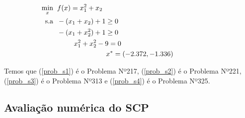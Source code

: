 
\vspace{-0.5cm}

\begin{subequations}
  \label{prob_s4}
  \begin{align}
    \hspace{0pt}\hfill \underset{x}{\text{min}} \hspace{0.2cm} & f(x) =  x_1^2 + x_2 \hspace{2.18cm} \\
    \hspace{0pt}\hfill \text{s.a} \hspace{0.2cm} & -(x_1 + x_2) + 1 \geq 0 \hspace{2.18cm} \\
    \hspace{0pt}\hfill & \hspace{0cm} -(x_1 + x_2^2) + 1 \geq 0 \hspace{2.18cm} \\
    \hspace{0pt}\hfill & \hspace{0.85cm} x_1^2 + x_2^2 - 9 = 0 \hspace{2.18cm} \\
    \hspace{0pt}\hfill & \hspace{2.48cm} x^* = (-2.372 ,-1.336) \hspace{2.18cm}
  \end{align}
\end{subequations}






Temos que (\ref{prob_s1}) é o Problema Nº217, (\ref{prob_s2}) é o Problema Nº221,
(\ref{prob_s3}) é o Problema Nº313 e (\ref{prob_s4}) é o Problema Nº325.

\subsection{Avaliação numérica do SCP}

